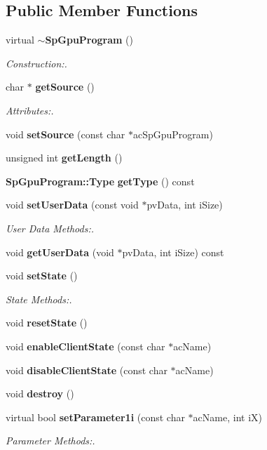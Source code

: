 \subsection*{Public Member Functions}
\begin{CompactItemize}
\item 
virtual {\bf $\sim$Sp\-Gpu\-Program} ()
\begin{CompactList}\small\item\em Construction:. \item\end{CompactList}\item 
char $\ast$ {\bf get\-Source} ()
\begin{CompactList}\small\item\em Attributes:. \item\end{CompactList}\item 
void {\bf set\-Source} (const char $\ast$ac\-Sp\-Gpu\-Program)
\item 
unsigned int {\bf get\-Length} ()
\item 
{\bf Sp\-Gpu\-Program::Type} {\bf get\-Type} () const
\item 
void {\bf set\-User\-Data} (const void $\ast$pv\-Data, int i\-Size)
\begin{CompactList}\small\item\em User Data Methods:. \item\end{CompactList}\item 
void {\bf get\-User\-Data} (void $\ast$pv\-Data, int i\-Size) const
\item 
void {\bf set\-State} ()
\begin{CompactList}\small\item\em State Methods:. \item\end{CompactList}\item 
void {\bf reset\-State} ()
\item 
void {\bf enable\-Client\-State} (const char $\ast$ac\-Name)
\item 
void {\bf disable\-Client\-State} (const char $\ast$ac\-Name)
\item 
void {\bf destroy} ()
\item 
virtual bool {\bf set\-Parameter1i} (const char $\ast$ac\-Name, int i\-X)
\begin{CompactList}\small\item\em Parameter Methods:. \item\end{CompactList}\item 

\end{CompactItemize}
